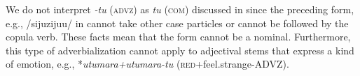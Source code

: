 We do not interpret \textit{{}-tu} (\textsc{advz}) as \textit{tu} (\textsc{com}) discussed in  since the preceding form, e.g., /sijuzijuu/ in  cannot take other case particles or cannot be followed by the copula verb. These facts mean that the form cannot be a nominal. Furthermore, this type of adverbialization cannot apply to adjectival stems that express a kind of emotion, e.g., *\textit{utumara+utumara-tu} (\textsc{red}+feel.strange-ADVZ).
